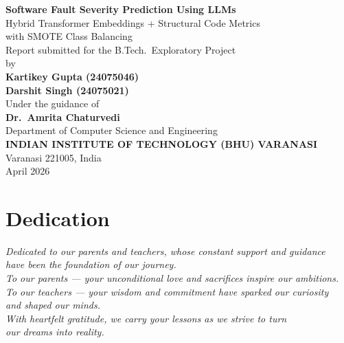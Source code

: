 \documentclass[12pt, a4paper]{report}
\begin{document}
\begin{titlepage}
\centering
\vspace*{0.5cm}

{\Large \textbf{Software Fault Severity Prediction Using LLMs}}\\[0.4cm]
{\large Hybrid Transformer Embeddings + Structural Code Metrics\\
with SMOTE Class Balancing}\\[1.2cm]

{\normalsize Report submitted for the B.Tech.\ Exploratory Project}\\[1.5cm]

{\normalsize by}\\[0.6cm]
{\large \textbf{Kartikey Gupta (24075046)}}\\[0.3cm]
{\large \textbf{Darshit Singh (24075021)}}\\[1.5cm]

{\normalsize Under the guidance of}\\[0.4cm]
{\large \textbf{Dr.\ Amrita Chaturvedi}}\\[0.3cm]
{\normalsize Department of Computer Science and Engineering}\\[1.2cm]

{\large \textbf{INDIAN INSTITUTE OF TECHNOLOGY (BHU) VARANASI}}\\[0.2cm]
{\normalsize Varanasi 221005, India}\\[0.3cm]
{\normalsize April 2026}
\end{titlepage}

\chapter*{Dedication}
\thispagestyle{plain}
\vspace*{2cm}
\begin{center}
\textit{Dedicated to our parents and teachers, whose constant support and guidance\\
have been the foundation of our journey.\\[0.5cm]
To our parents --- your unconditional love and sacrifices inspire our ambitions.\\
To our teachers --- your wisdom and commitment have sparked our curiosity\\
and shaped our minds.\\[0.5cm]
With heartfelt gratitude, we carry your lessons as we strive to turn\\
our dreams into reality.}
\end{center}
\end{document}
